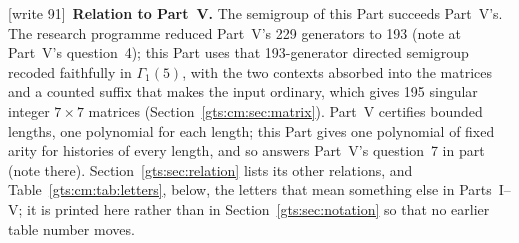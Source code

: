 \documentclass[11pt,letterpaper]{article}
\theoremstyle{definition}
\theoremstyle{remark}
\newcommand{\wtagd}{\textup{[write 91]}}
\begin{document}
\wtagd\ \textbf{Relation to Part~V.} The semigroup of this Part succeeds Part~V's. The research programme reduced Part~V's 229 generators to 193 (note at Part~V's question~4); this Part uses that 193-generator directed semigroup recoded faithfully in $\Gamma_1(5)$, with the two contexts absorbed into the matrices and a counted suffix that makes the input ordinary, which gives 195 singular integer $7\times7$ matrices (Section~\ref{gts:cm:sec:matrix}). Part~V certifies bounded lengths, one polynomial for each length; this Part gives one polynomial of fixed arity for histories of every length, and so answers Part~V's question~7 in part (note there). Section~\ref{gts:sec:relation} lists its other relations, and Table~\ref{gts:cm:tab:letters}, below, the letters that mean something else in Parts~I--V; it is printed here rather than in Section~\ref{gts:sec:notation} so that no earlier table number moves.
\end{document}
